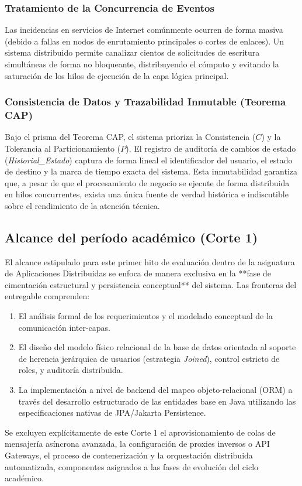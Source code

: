 \documentclass[12pt,letterpaper]{article}
\begin{document}
\subsubsection{Tratamiento de la Concurrencia de Eventos}
Las incidencias en servicios de Internet comúnmente ocurren de forma masiva (debido a fallas en nodos de enrutamiento principales o cortes de enlaces). Un sistema distribuido permite canalizar cientos de solicitudes de escritura simultáneas de forma no bloqueante, distribuyendo el cómputo y evitando la saturación de los hilos de ejecución de la capa lógica principal.

\subsubsection{Consistencia de Datos y Trazabilidad Inmutable (Teorema CAP)}
Bajo el prisma del Teorema CAP, el sistema prioriza la Consistencia ($C$) y la Tolerancia al Particionamiento ($P$). El registro de auditoría de cambios de estado (\textit{Historial\_Estado}) captura de forma lineal el identificador del usuario, el estado de destino y la marca de tiempo exacta del sistema. Esta inmutabilidad garantiza que, a pesar de que el procesamiento de negocio se ejecute de forma distribuida en hilos concurrentes, exista una única fuente de verdad histórica e indiscutible sobre el rendimiento de la atención técnica.

\subsection{Alcance del período académico (Corte 1)}
El alcance estipulado para este primer hito de evaluación dentro de la asignatura de Aplicaciones Distribuidas se enfoca de manera exclusiva en la **fase de cimentación estructural y persistencia conceptual** del sistema. Las fronteras del entregable comprenden:
\begin{enumerate}
    \item El análisis formal de los requerimientos y el modelado conceptual de la comunicación inter-capas.
    \item El diseño del modelo físico relacional de la base de datos orientada al soporte de herencia jerárquica de usuarios (estrategia \textit{Joined}), control estricto de roles, y auditoría distribuida.
    \item La implementación a nivel de backend del mapeo objeto-relacional (ORM) a través del desarrollo estructurado de las entidades base en Java utilizando las especificaciones nativas de JPA/Jakarta Persistence.
\end{enumerate}
Se excluyen explícitamente de este Corte 1 el aprovisionamiento de colas de mensajería asíncrona avanzada, la configuración de proxies inversos o API Gateways, el proceso de contenerización y la orquestación distribuida automatizada, componentes asignados a las fases de evolución del ciclo académico.
\end{document}
